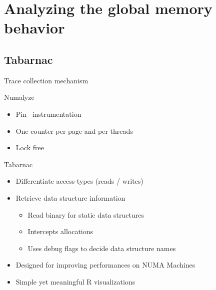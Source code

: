 \documentclass[xcolor={usenames,dvipsnames},hyperref={pdfusetitle}]{beamer}
\begin{document}
\section{Analyzing the global memory behavior}

\subsection{Tabarnac}

\begin{frame}{Trace collection mechanism}
    \begin{block}{Numalyze~\cite{Diener15Characterizing}}
        \begin{itemize}
            \item Pin~\cite{Luk05Pin} instrumentation
            \item One counter per page and per threads
            \item Lock free
        \end{itemize}
    \end{block}
    \pause
    \begin{alertblock}{Tabarnac}
        \begin{itemize}
            \item Differentiate access types (reads / writes)
            \item Retrieve data structure information
                \begin{itemize}
                    \item Read binary for static data structures
                    \item Intercepts allocations
                    \item Uses debug flags to decide data structure names
                \end{itemize}
            \item Designed for improving performances on NUMA Machines
            \item Simple yet meaningful R visualizations
        \end{itemize}
    \end{alertblock}
\end{frame}
\end{document}
